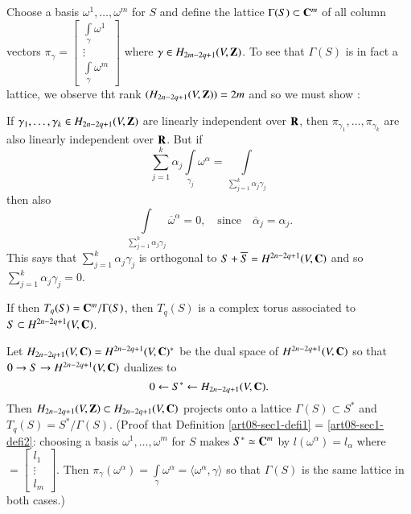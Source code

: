\begin{definition}\label{art08-sec1-defi1}
Choose a basis $\omega^{1},\ldots,\omega^{m}$ for $S$ and define the lattice $\Gamma(S)\subset \mathbf{C}^{m}$ of all column vectors $\pi_{\gamma}=\left[\begin{smallmatrix} \int\limits_{\gamma}\omega^{1}\\ \vdots\\ \int\limits_{\gamma}\omega^{m}\end{smallmatrix}\right]$ where $\gamma\in H_{2m-2q+1}(V,\mathbf{Z})$. To see that $\Gamma(S)$ is in fact a lattice, we observe tht rank $(H_{2n-2q+1}(V,\mathbf{Z}))=2m$ and so we must show :
\end{definition}

If $\gamma_{1},\ldots,\gamma_{k}\in H_{2n-2q+1}(V,\mathbf{Z})$ are linearly independent over $\mathbf{R}$, then $\pi_{\gamma_{1}},\ldots,\pi_{\gamma_{k}}$ are also linearly independent over $\mathbf{R}$. But if 
$$
\sum\limits^{k}_{j=1}\alpha_{j}\int\limits_{\gamma_{j}}\omega^{\alpha}=\int\limits_{\sum\limits^{k}_{j=1}\alpha_{j}\gamma_{j}}
$$\pageoriginale
then also
$$
\int\limits_{\sum\limits^{k}_{j=1}\alpha_{j}\gamma_{j}}\overline{\omega}^{\alpha}=0,\quad\text{since}\quad \overline{\alpha}_{j}=\alpha_{j}.
$$
This says that $\sum\limits^{k}_{j=1}\alpha_{j}\gamma_{j}$ is orthogonal to $S+\overline{S}=H^{2n-2q+1}(V,\mathbf{C})$ and so $\sum\limits^{k}_{j=1}\alpha_{j}\gamma_{j}=0$.

If then $T_{q}(S)=\mathbf{C}^{m}/\Gamma(S)$, then $T_{q}(S)$ is a complex torus associated to $S\subset H^{2n-2q+1}(V,\mathbf{C})$.

\begin{definition}\label{art08-sec1-defi2}
Let $H_{2n-2q+1}(V,\mathbf{C})=H^{2n-2q+1}(V,\mathbf{C})^{*}$ be the dual space of $H^{2n-2q+1}(V,\mathbf{C})$ so that $0\to S\to H^{2n-2q+1}(V,\mathbf{C})$ dualizes to 
\begin{equation}
0\leftarrow S^{*}\leftarrow H_{2n-2q+1}(V,\mathbf{C}).\label{art08-sec1-eq1.5}
\end{equation}
Then $H_{2n-2q+1}(V,\mathbf{Z})\subset H_{2n-2q+1}(V,\mathbf{C})$ projects onto a lattice $\Gamma(S)\subset S^{*}$ and $T_{q}(S)=S^{*}/\Gamma(S)$. (Proof that Definition \ref{art08-sec1-defi1} = \ref{art08-sec1-defi2}: choosing a basis $\omega^{1},\ldots,\omega^{m}$ for $S$ makes $S^{*}\simeq \mathbf{C}^{m}$ by $l(\omega^{\alpha})=l_{\alpha}$ where $=\left[\begin{smallmatrix} l_{1}\\ \vdots \\ l_{m}\end{smallmatrix}\right]$. Then $\pi_{\gamma}(\omega^{\alpha})=\int\limits_{\gamma}\omega^{\alpha}=\langle \omega^{\alpha},\gamma\rangle$ so that $\Gamma(S)$ is the same lattice in both cases.)
\end{definition}

